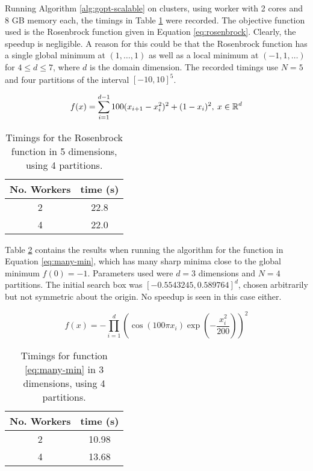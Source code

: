 \documentclass[../scalable-gopt.tex]{subfiles}
\begin{document}
  Running Algorithm \ref{alg:gopt-scalable} on clusters, 
  using worker with 2 cores and 8 GB memory each, 
  the timings in Table \ref{tab:scalable-gopt-rosenbrock} were recorded.
  The objective function used is the Rosenbrock function given in Equation \ref{eq:rosenbrock}.
  Clearly, the speedup is negligible.
  A reason for this could be that the Rosenbrock function has a single global minimum at $(1,\dots,1)$ 
  as well as a local minimum at $(-1,1,\dots)$ for $4 \le d \le 7$, 
  where $d$ is the domain dimension.
  The recorded timings use $N = 5$ and four partitions of the interval $[-10,10]^5$.

  \begin{equation}
    \label{eq:rosenbrock}
    f(x) = \sum_{i = 1}^{d - 1} 100 ( x_{i+1} - x_i^2)^2 + (1 - x_i)^2, \: x \in \mathbb{R}^d
  \end{equation}

  \begin{table}[ht]
    \centering
    \begin{tabular}{|c|c|}
      \hline
      No. Workers & time (s) \\
      \hline
      2 & 22.8 \\
      \hline
      4 & 22.0 \\
      \hline
    \end{tabular}
    \caption{Timings for the Rosenbrock function in 5 dimensions, using 4 partitions.}
    \label{tab:scalable-gopt-rosenbrock}
  \end{table}

  Table \ref{tab:scalable-gopt-many-min} contains the results when running the
  algorithm for the function in Equation \ref{eq:many-min}, 
  which has many sharp minima close to the global minimum $f(0) = -1$.
  Parameters used were $d = 3$ dimensions and $N = 4$ partitions.
  The initial search box was $[-0.5543245,0.589764]^d$, 
  chosen arbitrarily but not symmetric about the origin.
  No speedup is seen in this case either.

  \begin{equation}
    \label{eq:many-min}
    f(x) = - \prod_{i=1}^d \left( \cos(100 \pi x_i) \exp(-\frac{x_i^2}{200}) \right) ^ 2
  \end{equation}

  \begin{table}[ht]
    \caption{Timings for function \ref{eq:many-min} in 3 dimensions, using 4 partitions.}
    \label{tab:scalable-gopt-many-min}
    \centering
    \begin{tabular}{|c|c|}
      \hline
      No. Workers & time (s) \\
      \hline
      2 & 10.98 \\
      \hline
      4 & 13.68 \\ 
      \hline
    \end{tabular}
  \end{table}
\end{document}

